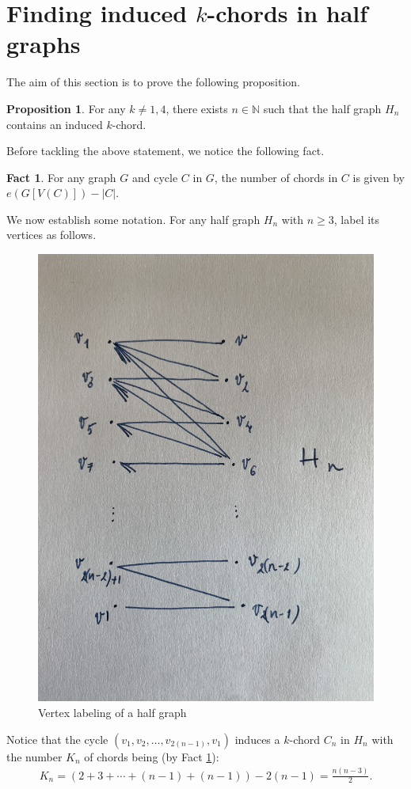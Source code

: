 \documentclass[12pt]{article}
\theoremstyle{definition}
\newtheorem{prop}[thm]{Proposition}
\newtheorem{fact}[thm]{Fact}
\begin{document}
    \section{Finding induced \texorpdfstring{$k$}{k}-chords in half graphs}
    
    The aim of this section 
    is to prove the following 
    proposition.

    \begin{prop} \label{prop:hg}
        For any $k \neq 1, 4$,
        there exists $n \in \mathbb{N}$
        such that the half
        graph $H_{n}$ 
        contains an induced 
        $k$-chord.
    \end{prop}

    Before tackling the
    above statement, we notice the
    following fact.
    
    \begin{fact} \label{fact:edges}
        For any graph $G$
        and cycle $C$ in $G$, 
        the number of chords in $C$ 
        is given by $e\left(G\left[V\left(C\right)\right]\right)
        - \left|C\right|$.
    \end{fact}
    
    We now establish 
    some notation. For
    any half graph $H_{n}$ 
    with $n \geq 3$, label
    its vertices as follows.
    \begin{figure}[h]
        \centering
        \includegraphics[width=0.35\linewidth, angle=270]{Figure_k-chord.jpg}
        \caption{Vertex labeling of a half graph}
        \label{fig:hg}
    \end{figure}

    Notice that the cycle
    $\left(v_1, v_2, \ldots,
    v_{2\left(n-1\right)}, v_1\right)$ 
    induces a $k$-chord
    $C_{n}$ in $H_{n}$
    with the number $K_{n}$ 
    of chords being (by Fact \ref{fact:edges}):
    \begin{gather*}
        K_{n} = \left(
        2 + 3 + \cdots + \left(n-1\right)
        + \left(n-1\right)\right)
        -2\left(n-1\right) =
        \frac{n\left(n-3\right)}{2}.
    \end{gather*}
    
\end{document}
